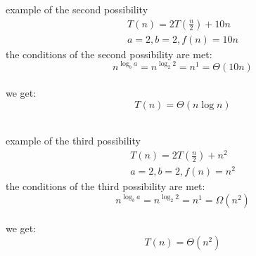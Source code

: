 \documentclass[a4paper,12pt]{article}
\begin{document}
\begin{my_example}
example of the second possibility\\
\begin{gather*}
  T(n) = 2T\left(\frac{n}{2}\right) + 10n\\
  a = 2, b = 2, f(n) = 10n
\end{gather*}
the conditions of the second possibility are met:\\
\[ n^{\log_b{a}} = n^{\log_2{2}} = n^1 = \Theta(10n) \]\\
we get:\\
\[ T(n) = \Theta(n\log{n}) \]\\
\end{my_example}

\begin{my_example}
example of the third possibility\\
\begin{gather*}
  T(n) = 2T\left(\frac{n}{2}\right) + n^2\\
  a=2,b=2,f(n)=n^2
\end{gather*}
the conditions of the third possibility are met:\\
\[ n^{\log_b{a}} = n^{\log_2{2}} = n^1 = \Omega(n^2) \]\\
we get:\\
\[ T(n) = \Theta\left(n^2\right) \]\\
\end{my_example}
\end{document}
